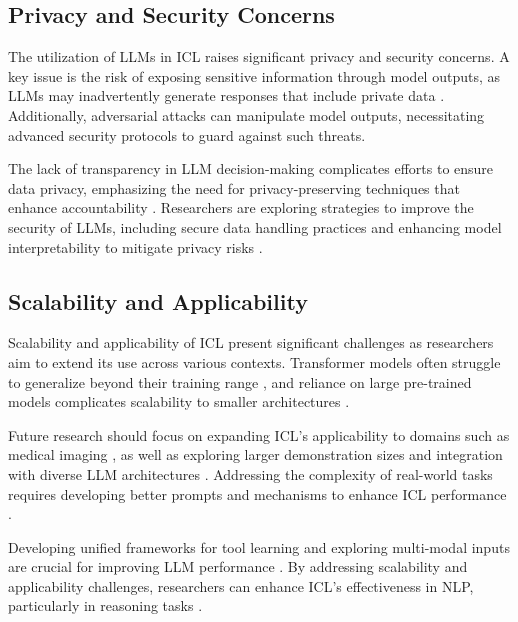 \subsection{Privacy and Security Concerns} \label{subsec:Privacy and Security Concerns}

The utilization of LLMs in ICL raises significant privacy and security concerns. A key issue is the risk of exposing sensitive information through model outputs, as LLMs may inadvertently generate responses that include private data \cite{si2024iclguardcontrollingincontextlearning}. Additionally, adversarial attacks can manipulate model outputs, necessitating advanced security protocols to guard against such threats.

The lack of transparency in LLM decision-making complicates efforts to ensure data privacy, emphasizing the need for privacy-preserving techniques that enhance accountability \cite{moradi2024exploringlandscapelargelanguage}. Researchers are exploring strategies to improve the security of LLMs, including secure data handling practices and enhancing model interpretability to mitigate privacy risks \cite{si2024iclguardcontrollingincontextlearning}.

\subsection{Scalability and Applicability} \label{subsec:Scalability and Applicability}

Scalability and applicability of ICL present significant challenges as researchers aim to extend its use across various contexts. Transformer models often struggle to generalize beyond their training range \cite{yuan2024focusedlargelanguagemodels}, and reliance on large pre-trained models complicates scalability to smaller architectures \cite{chen2023stabilizedincontextlearningpretrained}.

Future research should focus on expanding ICL's applicability to domains such as medical imaging \cite{ferber2024incontextlearningenablesmultimodal}, as well as exploring larger demonstration sizes and integration with diverse LLM architectures \cite{yuan2024focusedlargelanguagemodels}. Addressing the complexity of real-world tasks requires developing better prompts and mechanisms to enhance ICL performance \cite{kossen2024incontextlearninglearnslabel}. 

Developing unified frameworks for tool learning and exploring multi-modal inputs are crucial for improving LLM performance \cite{qu2024toollearninglargelanguage}. By addressing scalability and applicability challenges, researchers can enhance ICL's effectiveness in NLP, particularly in reasoning tasks \cite{zhou2024mysteryincontextlearningcomprehensive,mo2024ciclcontrastiveincontextlearning,he2024usingnaturallanguageexplanations}.









